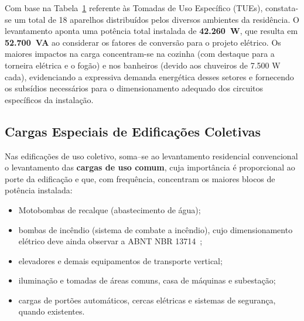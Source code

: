 \documentclass[12pt,openright,oneside,a4paper,brazil]{abntex2}
\begin{document}
\begin{table}[H]
\begin{sideways}
\begin{minipage}{\textheight}
\begin{tabular}{cccccc}
        \end{tabular}
        
        \vspace{0.15cm}
        \label{tab:tues}
    \end{minipage}
\end{sideways}

\end{table}

\newpage

Com base na Tabela~\ref{tab:tues} referente às Tomadas de Uso Específico (TUEs), constata-se um total de 18 aparelhos distribuídos pelos diversos ambientes da residência. O levantamento aponta uma potência total instalada de \textbf{42.260~W}, que resulta em \textbf{52.700~VA} ao considerar os fatores de conversão para o projeto elétrico. Os maiores impactos na carga concentram-se na cozinha (com destaque para a torneira elétrica e o fogão) e nos banheiros (devido aos chuveiros de 7.500 W cada), evidenciando a expressiva demanda energética desses setores e fornecendo os subsídios necessários para o dimensionamento adequado dos circuitos específicos da instalação.

\subsection{Cargas Especiais de Edificações Coletivas}

\hspace{1.27cm} Nas edificações de uso coletivo, soma--se ao levantamento residencial
convencional o levantamento das \textbf{cargas de uso comum}, cuja
importância é proporcional ao porte da edificação e que, com frequência,
concentram os maiores blocos de potência instalada:

\begin{itemize}[leftmargin=1.2cm]
    \item Motobombas de recalque (abastecimento de água);
    \item bombas de incêndio (sistema de combate a incêndio), cujo
    dimensionamento elétrico deve ainda observar a ABNT NBR 13714~\cite{nbr13714};
    \item elevadores e demais equipamentos de transporte vertical;
    \item iluminação e tomadas de áreas comuns, casa de máquinas e
    subestação;
    \item cargas de portões automáticos, cercas elétricas e sistemas de
    segurança, quando existentes.
\end{itemize}
\end{document}
